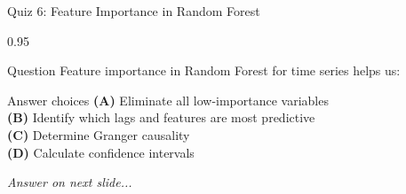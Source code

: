 \documentclass[9pt, aspectratio=169, t]{beamer}
\begin{document}
\begin{frame}{Quiz 6: Feature Importance in Random Forest}
    \begin{cminipage}{0.95\textwidth}
    \begin{alertblock}{Question}
        Feature importance in Random Forest for time series helps us:
    \end{alertblock}

    \vspace{0.4cm}

    \begin{block}{Answer choices}
        \textcolor{MainBlue}{\textbf{(A)}} Eliminate all low-importance variables\\[3pt]
        \textcolor{MainBlue}{\textbf{(B)}} Identify which lags and features are most predictive\\[3pt]
        \textcolor{MainBlue}{\textbf{(C)}} Determine Granger causality\\[3pt]
        \textcolor{MainBlue}{\textbf{(D)}} Calculate confidence intervals
    \end{block}

    \vspace{0.5cm}

    \begin{center}
        \textit{Answer on next slide...}
    \end{center}
    \end{cminipage}
\end{frame}
\end{document}
